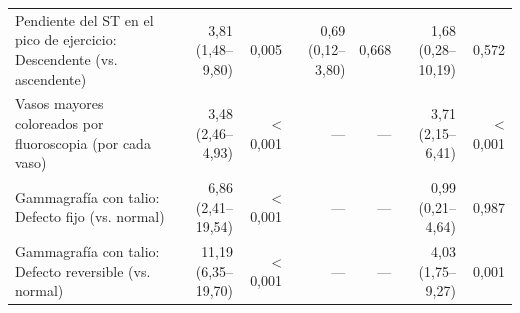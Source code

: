\begin{table}[H]
\begin{tabular}{lrrrrrr}
Pendiente del ST en el pico de ejercicio: Descendente (vs. ascendente) & 3,81 (1,48–9,80) & 0,005 & 0,69 (0,12–3,80) & 0,668 & 1,68 (0,28–10,19) & 0,572 \\
Vasos mayores coloreados por fluoroscopia (por cada vaso) & 3,48 (2,46–4,93) & < 0,001 & — & — & 3,71 (2,15–6,41) & < 0,001 \\
Gammagrafía con talio: Defecto fijo (vs. normal) & 6,86 (2,41–19,54) & < 0,001 & — & — & 0,99 (0,21–4,64) & 0,987 \\
Gammagrafía con talio: Defecto reversible (vs. normal) & 11,19 (6,35–19,70) & < 0,001 & — & — & 4,03 (1,75–9,27) & 0,001 \\
\bottomrule
\end{tabular}
\end{table}
